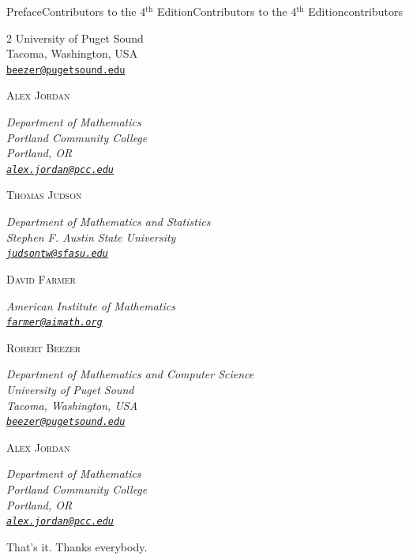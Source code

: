 \documentclass[oneside,10pt,]{book}
\newcommand{\mono}[1]{\texttt{#1}}
\numberwithin{equation}{section}
\newcommand{\contributor}[1]{\parbox{\linewidth}{#1}\par\bigskip}
\newcommand{\contributorname}[1]{\textsc{#1}\\[0.25\baselineskip]}
\newcommand{\contributorinfo}[1]{\hspace*{0.05\linewidth}\parbox{0.95\linewidth}{\textsl{#1}}}
\begin{document}
\begin{preface}{Preface}{Contributors to the 4\(^\mathrm{th}\) Edition}{}{Contributors to the 4\(^\mathrm{th}\) Edition}{}{}{contributors}
\begin{multicols}{2}
{{University of Puget Sound\\
Tacoma, Washington, USA\\
\mono{\href{mailto:beezer@pugetsound.edu}{\nolinkurl{beezer@pugetsound.edu}}}}%
}%
\hypertarget{contributors-3-16}{}%
\contributor{%
\contributorname{Alex Jordan}%
\contributorinfo{Department of Mathematics\\
Portland Community College\\
Portland, OR\\
\mono{\href{mailto:alex.jordan@pcc.edu}{\nolinkurl{alex.jordan@pcc.edu}}}}%
}%
\hypertarget{contributors-3-17}{}%
\contributor{%
\contributorname{Thomas Judson}%
\contributorinfo{Department of Mathematics and Statistics\\
Stephen F. Austin State University\\
\mono{\href{mailto:judsontw@sfasu.edu}{\nolinkurl{judsontw@sfasu.edu}}}}%
}%
\hypertarget{contributors-3-18}{}%
\contributor{%
\contributorname{David Farmer}%
\contributorinfo{American Institute of Mathematics\\
\mono{\href{mailto:farmer@aimath.org}{\nolinkurl{farmer@aimath.org}}}}%
}%
\hypertarget{contributors-3-19}{}%
\contributor{%
\contributorname{Robert Beezer}%
\contributorinfo{Department of Mathematics and Computer Science\\
University of Puget Sound\\
Tacoma, Washington, USA\\
\mono{\href{mailto:beezer@pugetsound.edu}{\nolinkurl{beezer@pugetsound.edu}}}}%
}%
\hypertarget{contributors-3-20}{}%
\contributor{%
\contributorname{Alex Jordan}%
\contributorinfo{Department of Mathematics\\
Portland Community College\\
Portland, OR\\
\mono{\href{mailto:alex.jordan@pcc.edu}{\nolinkurl{alex.jordan@pcc.edu}}}}%
}%
\end{multicols}
That's it.  Thanks everybody.%
\end{preface}
\setcounter{tocdepth}{1}
\renewcommand*\contentsname{Contents}
\tableofcontents
\mainmatter
%
%
\typeout{************************************************}
\typeout{************************************************}
%
\end{document}
